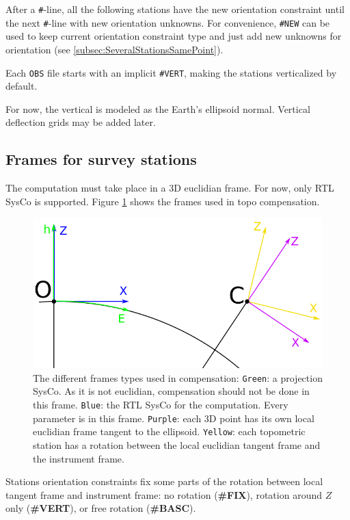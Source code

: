 After a \texttt{\#}-line, all the following stations have the new orientation constraint until the next \texttt{\#}-line with new orientation unknowns.
For convenience, \texttt{\#NEW} can be used to keep current orientation constraint type and just add new unknowns for orientation (see \ref{subsec:SeveralStationsSamePoint}).


Each \texttt{OBS} file starts with an implicit \texttt{\#VERT}, making the stations verticalized by default.

For now, the vertical is modeled as the Earth's ellipsoid normal. Vertical deflection grids may be added later.



\subsection{Frames for survey stations}

The computation must take place in a 3D euclidian frame. For now, only RTL SysCo is supported.
Figure \ref{fig:topoFrames} shows the frames used in topo compensation.

\begin{figure}[!h]
\centering
\includegraphics[width=12cm]{Programmer/framesTopo.png}
\caption{The different frames types used in compensation:
   \texttt{Green}: a projection SysCo. As it is not euclidian, compensation should not be done in this frame.
   \texttt{Blue}: the RTL SysCo for the computation. Every parameter is in this frame.
   \texttt{Purple}: each 3D point has its own local euclidian frame tangent to the ellipsoid.
   \texttt{Yellow}: each topometric station has a rotation between the local euclidian tangent frame and the instrument frame.
 }
\label{fig:topoFrames}
\end{figure}


Stations orientation constraints fix some parts of the rotation between local tangent frame and instrument frame:
no rotation (\textbf{\#FIX}), rotation around $Z$ only (\textbf{\#VERT}), or free rotation (\textbf{\#BASC}).



